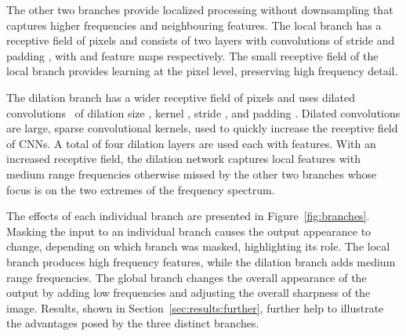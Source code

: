 \documentclass{egpubl}
\newcommand{\tc}[1]{{#1}}
\begin{document}
The other two branches provide localized processing without downsampling that
captures higher frequencies and neighbouring features. The local branch has a
receptive field of  pixels and consists of two layers with 
convolutions of stride  and padding , with  and  feature maps
respectively. The small receptive field of the local branch provides learning
at the pixel level, preserving high frequency detail.

The dilation branch has a wider receptive field of  pixels and uses
dilated convolutions~\cite{yu2015dilated} of dilation size , kernel
, stride , and padding . Dilated convolutions are large, sparse
convolutional kernels, used to quickly increase the receptive field of CNNs. A
total of four dilation layers are used each with  features. With an
increased receptive field, the dilation network captures local features with
medium range frequencies otherwise missed by the other two branches whose focus
is on the two extremes of the frequency spectrum.

The effects of each individual branch are presented in
Figure~\ref{fig:branches}. Masking the input to an individual branch causes the
output appearance to change, depending on which branch was masked, highlighting
its role. The local branch produces high frequency features,
while the dilation branch adds medium range frequencies. The global branch
changes the overall appearance of the output by adding low frequencies and
adjusting the overall sharpness of the image. \tc{Results, shown in Section~\ref{sec:results:further}, further 
help to illustrate the advantages posed by the three distinct branches.}
\end{document}
